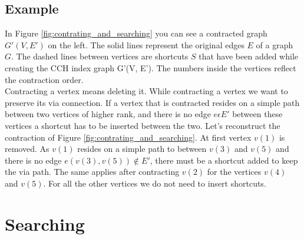 \subsection{Example}

In Figure \ref{fig:contrating_and_searching} you can see a contracted graph $G'(V,E')$ on the left. The solid lines represent the original edges $E$ of a graph $G$. The dashed lines between vertices are shortcuts $S$ that 
have been added while creating the CCH index graph G'(V, E'). The numbers inside the vertices reflect the contraction order.
\\
Contracting a vertex means deleting it. While contracting a vertex we want to preserve its via connection. If a vertex that is contracted resides on a simple path between two vertices of higher rank,
and there is no edge $e \epsilon E'$ between these vertices a shortcut has to be inserted between the two. 
Let's reconstruct the contraction of Figure \ref{fig:contrating_and_searching}. At first vertex $v(1)$ is removed. As $v(1)$ resides on a simple path to between $v(3)$ and $v(5)$ and there is no edge $e(v(3), v(5)) \notin E'$,
there must be a shortcut added to keep the via path.
The same applies after contracting $v(2)$ for the vertices $v(4)$ and $v(5)$. For all the other vertices we do not need to insert shortcuts.

\section{Searching}



